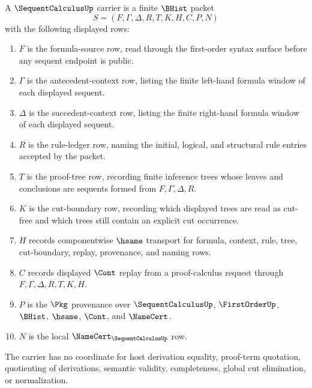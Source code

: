 \begin{definition}
\label{def:sequent-calculus-carrier}
A $\SequentCalculusUp$ carrier is a finite $\BHist$ packet
$$
S=(F,\Gamma,\Delta,R,T,K,H,C,P,N)
$$
with the following displayed rows:
\begin{enumerate}
\item $F$ is the formula-source row, read through the first-order syntax surface before any sequent endpoint is public.
\item $\Gamma$ is the antecedent-context row, listing the finite left-hand formula window of each displayed sequent.
\item $\Delta$ is the succedent-context row, listing the finite right-hand formula window of each displayed sequent.
\item $R$ is the rule-ledger row, naming the initial, logical, and structural rule entries accepted by the packet.
\item $T$ is the proof-tree row, recording finite inference trees whose leaves and conclusions are sequents formed from $F,\Gamma,\Delta,R$.
\item $K$ is the cut-boundary row, recording which displayed trees are read as cut-free and which trees still contain an explicit cut occurrence.
\item $H$ records componentwise $\hsame$ transport for formula, context, rule, tree, cut-boundary, replay, provenance, and naming rows.
\item $C$ records displayed $\Cont$ replay from a proof-calculus request through $F,\Gamma,\Delta,R,T,K,H$.
\item $P$ is the $\Pkg$ provenance over $\SequentCalculusUp$, $\FirstOrderUp$, $\BHist$, $\hsame$, $\Cont$, and $\NameCert$.
\item $N$ is the local $\NameCert_{\SequentCalculusUp}$ row.
\end{enumerate}
The carrier has no coordinate for host derivation equality, proof-term quotation, quotienting of derivations, semantic validity, completeness, global cut elimination, or normalization.
\end{definition}

